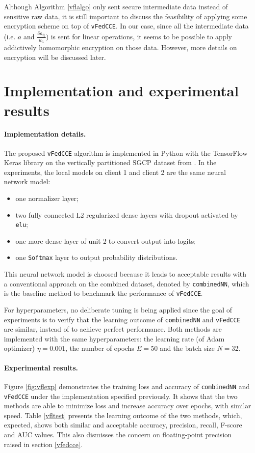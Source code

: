 \documentclass{article}
\begin{document}
Although Algorithm \ref{vflalgo} only sent secure intermediate data instead of sensitive raw data, it is still important to discuss the feasibility of applying some encryption scheme on top of \texttt{vFedCCE}. In our case, since all the intermediate data (i.e. $a$ and $\frac{\partial a_{ij}}{w_1}$) is sent for linear operations, it seems to be possible to apply addictively homomorphic encryption on those data. However, more details on encryption will be discussed later.

\section{Implementation and experimental results}\label{vflexp}
\paragraph{Implementation details.} The proposed \texttt{vFedCCE} algorithm is implemented in Python with the TensorFlow Keras library on the vertically partitioned SGCP dataset from \cite{groemping2019south}. In the experiments, the local models on client 1 and client 2 are the same neural network model:
\begin{itemize}
  \setlength\itemsep{0em}
  \item one normalizer layer;
  \item two fully connected L2 regularized dense layers with dropout activated by \texttt{elu};
  \item one more dense layer of unit $2$ to convert output into logits;
  \item one \texttt{Softmax} layer to output probability distributions.
\end{itemize}
This neural network model is choosed because it leads to acceptable results with a conventional approach on the combined dataset, denoted by \texttt{combinedNN}, which is the baseline method to benchmark the performance of \texttt{vFedCCE}.

For hyperparameters, no deliberate tuning is being applied since the goal of experiments is to verify that the learning outcome of \texttt{combinedNN} and \texttt{vFedCCE} are similar, instead of to achieve perfect performance. Both methods are implemented with the same hyperparameters: the learning rate (of Adam optimizer) $\eta=0.001$, the number of epochs $E=50$ and the batch size $N=32$.

\paragraph{Experimental results.} Figure \ref{fig:vflexp} demonstrates the training loss and accuracy of \texttt{combinedNN} and \texttt{vFedCCE} under the implementation specified previously. It shows that the two methods are able to minimize loss and increase accuracy over epochs, with similar speed. Table \ref{vfltest} presents the learning outcome of the two methods, which, expected, shows both similar and acceptable accuracy, precision, recall, F-score and AUC values. This also dismisses the concern on floating-point precision raised in section \ref{vfedcce}.
\end{document}
